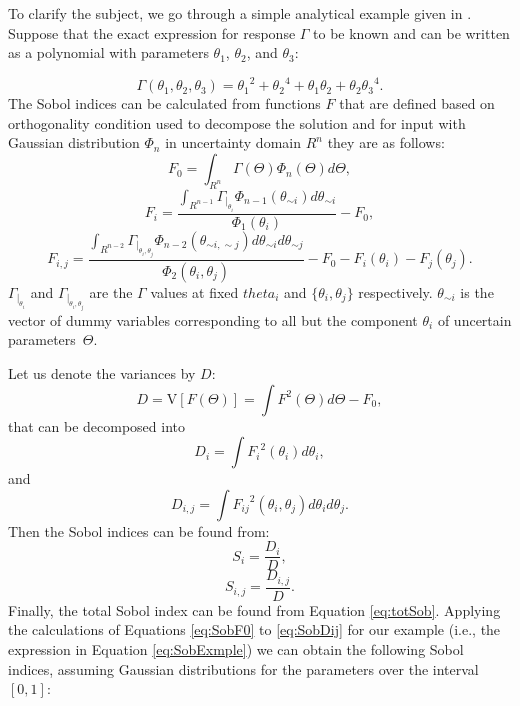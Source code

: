 To clarify the subject, we go through a simple analytical example given in
\cite{arwade2010variance}. Suppose that the exact expression for response
$\Gamma$ to be known and can be written as a polynomial with parameters
$\theta_1$, $\theta_2$, and $\theta_3$:
 
\begin{equation}
\Gamma(\theta_1,\theta_2,\theta_3) =
{\theta_1}^2+{\theta_2}^4+{\theta_1}{\theta_2}+{\theta_2}{\theta_3}^4.
\label{eq:SobExmple}\end{equation} The Sobol indices can be calculated from
functions $F$ that are defined based on orthogonality condition used to
decompose the solution and for input with Gaussian distribution $\Phi_n$ in
uncertainty domain $R^n$ they are as follows:
\begin{equation}
F_0=\int_{R^n}\Gamma(\Theta) \Phi_n(\Theta) d\Theta,
\label{eq:SobF0}\end{equation}
\begin{equation}
F_i=\frac{\int_{R^{n-1}}\Gamma_{|_{\theta_i}}
\Phi_{n-1}(\theta_{\sim i}) d\theta_{\sim i}}{\Phi_{1}(\theta_i)} - F_0,
\label{eq:SobFi}\end{equation}
\begin{equation}
F_{i,j}=\frac{\int_{R^{n-2}}\Gamma_{|_{\theta_i,\theta_j}}
\Phi_{n-2}(\theta_{\sim i,\sim j}) d\theta_{\sim i} d\theta_{\sim
j}}{\Phi_{2}(\theta_i,\theta_j)}-F_0-F_i(\theta_i)-F_j(\theta_j).
\label{eq:SobFij}\end{equation} $\Gamma_{|_{\theta_i}}$ and
$\Gamma_{|_{\theta_i,\theta_j}}$ are the $\Gamma$ values at fixed $theta_i$ and
$\{\theta_i,\theta_j\}$ respectively. $\theta_{\sim i}$ is the vector of dummy
variables corresponding to all but the component $\theta_i$ of uncertain
parameters~$\Theta$.

Let us denote the variances by $D$:
\begin{equation}
D=\mbox{V}[F(\Theta)]=\int F^2(\Theta) d\Theta-F_0,
\label{eq:SobD}\end{equation} that can be decomposed into 
\begin{equation}
D_i=\int{F_i}^2(\theta_i) d\theta_i,
\label{eq:SobDi}\end{equation} and
\begin{equation} 
D_{i,j}=\int{F_{ij}}^2(\theta_{i},\theta_{j}) d\theta_{i}d\theta_{j}.
\label{eq:SobDij}\end{equation} Then the Sobol indices can be found from:
\begin{equation} 
S_i=\frac{D_i}{D},
\label{eq:SiDi}\end{equation}
\begin{equation} 
S_{i,j}=\frac{D_{i,j}}{D}.
\label{eq:SijDij}\end{equation} Finally, the total Sobol index can be found
from Equation \ref{eq:totSob}. Applying the calculations of Equations
\ref{eq:SobF0} to \ref{eq:SobDij} for our example (i.e., the expression in
Equation \ref{eq:SobExmple}) we can obtain the following Sobol
indices,
assuming Gaussian distributions for the parameters over the interval $[0,1]$:

